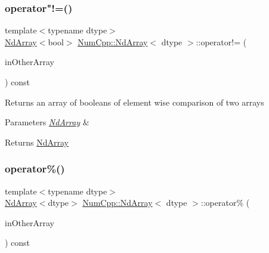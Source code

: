 \subsubsection{\texorpdfstring{operator"!=()}{operator!=()}\hspace{0.1cm}{\footnotesize\ttfamily [2/2]}}
{\footnotesize\ttfamily template$<$typename dtype$>$ \\
\mbox{\hyperlink{class_num_cpp_1_1_nd_array}{Nd\+Array}}$<$bool$>$ \mbox{\hyperlink{class_num_cpp_1_1_nd_array}{Num\+Cpp\+::\+Nd\+Array}}$<$ dtype $>$\+::operator!= (\begin{DoxyParamCaption}\item[{const \mbox{\hyperlink{class_num_cpp_1_1_nd_array}{Nd\+Array}}$<$ dtype $>$ \&}]{in\+Other\+Array }\end{DoxyParamCaption}) const\hspace{0.3cm}{\ttfamily [inline]}}

Returns an array of booleans of element wise comparison of two arrays


\begin{DoxyParams}{Parameters}
{\em \mbox{\hyperlink{class_num_cpp_1_1_nd_array}{Nd\+Array}}} & \\
\hline
\end{DoxyParams}
\begin{DoxyReturn}{Returns}
\mbox{\hyperlink{class_num_cpp_1_1_nd_array}{Nd\+Array}} 
\end{DoxyReturn}
\mbox{\label{class_num_cpp_1_1_nd_array_a8873edefefe506c1003d0efabefbea95}} 
\subsubsection{\texorpdfstring{operator\%()}{operator\%()}\hspace{0.1cm}{\footnotesize\ttfamily [1/2]}}
{\footnotesize\ttfamily template$<$typename dtype$>$ \\
\mbox{\hyperlink{class_num_cpp_1_1_nd_array}{Nd\+Array}}$<$dtype$>$ \mbox{\hyperlink{class_num_cpp_1_1_nd_array}{Num\+Cpp\+::\+Nd\+Array}}$<$ dtype $>$\+::operator\% (\begin{DoxyParamCaption}\item[{const \mbox{\hyperlink{class_num_cpp_1_1_nd_array}{Nd\+Array}}$<$ dtype $>$ \&}]{in\+Other\+Array }\end{DoxyParamCaption}) const\hspace{0.3cm}{\ttfamily [inline]}}


